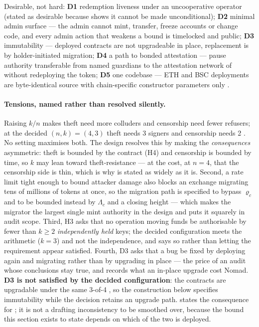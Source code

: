 \noindent Desirable, not hard: \textbf{D1} redemption liveness under an uncooperative operator
(stated as desirable because  shows it cannot be made unconditional);
\textbf{D2} minimal admin surface --- the admin cannot mint, transfer, freeze accounts or change
code, and every admin action that weakens a bound is timelocked and public; \textbf{D3}
immutability --- deployed contracts are not upgradeable in place, replacement is by holder-initiated
migration; \textbf{D4} a path to bonded attestation --- pause authority transferable from named
guardians to the attestation network of  without redeploying the token;
\textbf{D5} one codebase --- ETH and BSC deployments are byte-identical source with chain-specific
constructor parameters only .

\paragraph{Tensions, named rather than resolved silently.} Raising $k/n$ makes theft need more
colluders and censorship need fewer refusers; at the decided $(n,k) = (4,3)$ theft needs 3 signers
and censorship needs 2 \srcinferred. No setting maximises both. The design resolves this by making
the \emph{consequences} asymmetric: theft is bounded by the contract (H4) and censorship is bounded
by time, so $k$ may lean toward theft-resistance --- at the cost, at $n = 4$, that the censorship
side is thin, which is why  is stated as widely as it is. Second, a rate limit
tight enough to bound attacker damage also blocks an exchange migrating tens of millions of tokens at
once, so the migration path is specified to bypass $\varrho_c$ and to be bounded instead by
$\Lambda_c$ and a closing height --- which makes the migrator the largest single mint authority in
the design and puts it squarely in audit scope. Third, H3 asks that no operation moving funds be
authorisable by fewer than $k \ge 2$ \emph{independently held} keys; the decided configuration meets
the arithmetic ($k = 3$) and not the independence, and  says so rather than letting
the requirement appear satisfied. Fourth, D3 asks that a bug be fixed by deploying again and migrating
rather than by upgrading in place --- the price of an audit whose conclusions stay true, and
 records what an in-place upgrade cost Nomad. \textbf{D3 is not
satisfied by the decided configuration}: the contracts are upgradable under the same 3-of-4
, so the construction below specifies immutability while
the decision retains an upgrade path.  states the consequence for
; it is not a drafting inconsistency to be smoothed over, because the bound
this section exists to state depends on which of the two is deployed.

